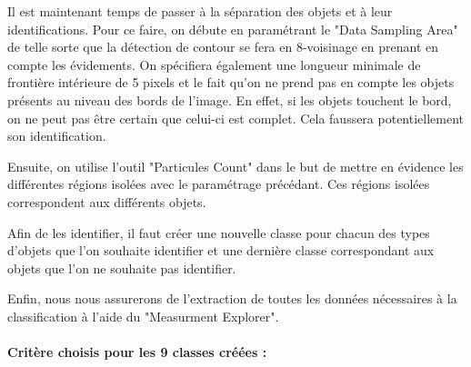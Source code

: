 \documentclass{scrreprt}
\begin{document}
Il est maintenant temps de passer à la séparation des objets et à leur identifications.
Pour ce faire, on débute en paramétrant le "Data Sampling Area" de telle sorte que la 
détection de contour se fera en 8-voisinage en prenant en compte les évidements. On spécifiera 
également une longueur minimale de frontière intérieure de 5 pixels et le fait qu'on ne 
prend pas en compte les objets présents au niveau des bords de l'image. En effet, 
si les objets touchent le bord, on ne peut pas être certain que celui-ci est complet. 
Cela faussera potentiellement son identification. 

Ensuite, on utilise l'outil "Particules Count" dans le but de mettre en évidence les différentes
régions isolées avec le paramétrage précédant. Ces régions isolées correspondent aux différents
objets. 

Afin de les identifier, il faut créer une nouvelle classe pour chacun des types d'objets
que l'on souhaite identifier et une dernière classe correspondant aux objets que l'on ne
souhaite pas identifier. 

Enfin, nous nous assurerons de l'extraction de toutes les données nécessaires à la classification
à l'aide du "Measurment Explorer".

\paragraph{Critère choisis pour les 9 classes créées :}
\end{document}
